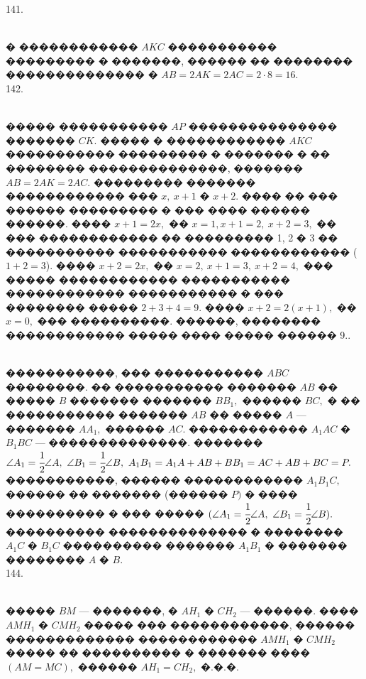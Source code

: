 \documentclass[12pt]{article}
\begin{document}
141. \begin{figure}[ht!]
\end{figure}\\
� ������������ $AKC$ ����������� ��������� � �������, ������ �� �������� �������������� � $AB=2AK=2AC=2\cdot8=16.$\\
142. \begin{figure}[ht!]
\end{figure}\\
����� ����������� $AP$ ��������������� ������� $CK.$ ����� � ������������ $AKC$ ����������� ��������� � ������� � �� �������� ��������������, ������� $AB=2AK=2AC.$ ��������� ������� ������������ ��� $x,\ x+1$ � $x+2.$ ���� �� ��� ������ ��������� � ��� ���� ������ ������. ���� $x+1=2x,$ �� $x=1, x+1=2,\ x+2=3,$ �� ��� ������������ �� ��������� 1, 2 � 3 �� ����������� ����������� ������������ ($1+2=3$). ���� $x+2=2x,$ �� $x=2,\ x+1=3,\ x+2=4,$ ��� ����� ������������ ����������� ������������ ����������� � ��� �������� ����� $2+3+4=9.$ ���� $x+2=2(x+1),$ �� $x=0,$ ��� ����������. ������, �������� ������������ ����� ���� ����� ������ 9.\newpage{}. \begin{figure}[ht!]
\end{figure}\\
�����������, ��� ����������� $ABC$ ��������. �� ����������� ������� $AB$ �� ����� $B$ ������� ������� $BB_1,$ ������ $BC,$ � �� ����������� ������� $AB$ �� ����� $A$ --- ������� $AA_1,$ ������ $AC.$ ������������ $A_1AC$ � $B_1BC$ --- ��������������. �������  $\angle A_1 = \cfrac{1}{2} \angle A,\  \angle B_1 = \cfrac{1}{2} \angle B,\ A_1B_1 = A_1A + AB + BB_1 = AC + AB + BC = P.$ �����������, ������ ������������ $A_1B_1C,$ ������ �� ������� (������ $P)$ � ���� ���������� � ��� �����
$(\angle A_1 = \cfrac{1}{2}\angle A,\ \angle B_1 =\cfrac{1}{2}\angle B).$  ���������� �������������� � �������� $A_1C$ � $B_1C$ ���������� ������� $A_1B_1$ � ������� �������� $A$ � $B.$\\
144. \begin{figure}[ht!]
\end{figure}\\
����� $BM$ --- �������, � $AH_1$ � $CH_2$ --- ������. ���� $AMH_1$ � $CMH_2$ ����� ��� ������������, ������ ������������� ������������ $AMH_1$ � $CMH_2$ ����� �� ���������� � ������� ���� $(AM=MC),$ ������ $AH_1=CH_2,$ �.�.�.\\
\end{document}
